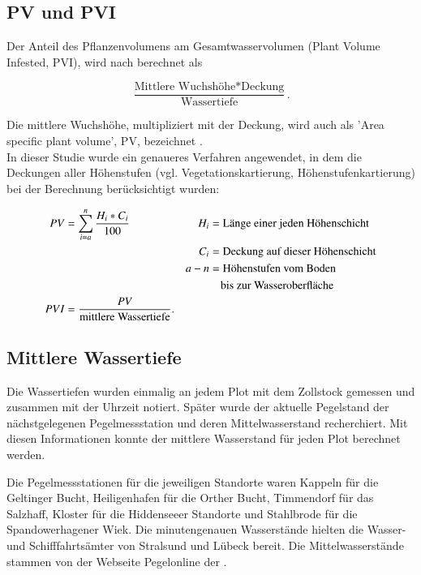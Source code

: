 \subsection{PV und PVI}

Der Anteil des Pflanzenvolumens am Gesamtwasservolumen (Plant Volume Infested, PVI), wird nach \cite{jeppesen_1998, schriver_1995, canfield_1984} berechnet als 

\begin{equation*}
\frac{\text{Mittlere Wuchshöhe} * \text{Deckung}}{\text{Wassertiefe}}.
\end{equation*}

Die mittlere Wuchshöhe, multipliziert mit der Deckung, wird auch als 'Area specific plant volume', PV, bezeichnet \citep{jeppesen_1998}.\\
In dieser Studie wurde ein genaueres Verfahren angewendet, in dem die Deckungen aller Höhenstufen (vgl. Vegetationskartierung, Höhenstufenkartierung) bei der Berechnung berücksichtigt wurden:


\begin{align*}
 PV &=\sum_{i=a}^n \frac{H_i * C_i}{100} & H_i &=\text{Länge einer jeden Höhenschicht}\\ 
 & & C_i &=\text{Deckung auf dieser Höhenschicht}\\
 & & a-n &=\text{Höhenstufen vom Boden}\\
 & &     &\text{\quad bis zur Wasseroberfläche}\\
 PVI &=\frac{PV}{\text{mittlere Wassertiefe}}.\\
\end{align*}



\subsection{Mittlere Wassertiefe}

Die Wassertiefen wurden einmalig an jedem Plot mit dem Zollstock gemessen und zusammen mit der Uhrzeit notiert. Später wurde der aktuelle Pegelstand der nächstgelegenen Pegelmessstation und deren Mittelwasserstand recherchiert. Mit diesen Informationen konnte der mittlere Wasserstand für jeden Plot berechnet werden.

Die Pegelmessstationen für die jeweiligen Standorte waren Kappeln für die Geltinger Bucht, Heiligenhafen für die Orther Bucht, Timmendorf für das Salzhaff, Kloster für die Hiddenseeer Standorte und Stahlbrode für die Spandowerhagener Wiek. Die minutengenauen Wasserstände hielten die Wasser- und Schifffahrtsämter von Stralsund und Lübeck bereit. Die Mittelwasserstände stammen von der Webseite Pegelonline der \cite{wasser-_und_schifffahrtsverwaltung_des_bundes_2013}.




